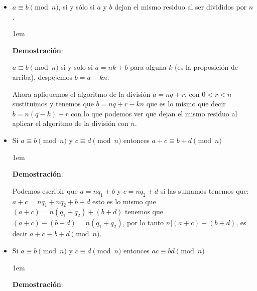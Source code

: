 \documentclass[12pt]{report}                                    %
\newenvironment{SmallIndentation}[1][0.75em]                    %
    {\begin{adjustwidth}{#1}{}\begin{footnotesize}}                 %
    {\end{footnotesize}\end{adjustwidth}}                           %
\begin{document}
\begin{itemize}
\begin{SmallIndentation}[1em]
                    \end{SmallIndentation}

                \item $a \equiv b \pmod{n}$, si y sólo si $a$ y $b$ dejan el mismo
                    residuo al ser divididos por $n$.

                    \begin{SmallIndentation}[1em]
                        \textbf{Demostración}:

                        $a \equiv b \pmod{n}$ si y solo si $a=nk+b$ para alguna $k$ (es
                        la proposición de arriba), despejemos $b=a-kn$.

                        Ahora apliquemos el algoritmo de la división $a=nq+r$, con $0<r<n$
                        sustituimos y tenemos que $b=nq+r -kn$ que es lo mismo que decir
                        $b=n(q-k)+r$ con lo que podemos ver que dejan el mismo residuo al 
                        aplicar el algoritmo de la división con $n$.

                    \end{SmallIndentation}


                \item Si $a \equiv b \pmod{n}$ y $c \equiv d \pmod{n}$ entonces
                        $a+c \equiv b+d \pmod{n}$

                    \begin{SmallIndentation}[1em]
                        \textbf{Demostración}:

                        Podemos escribir que $a=nq_1+b$ y $c=nq_2+d$ si las sumamos tenemos que:
                        $a+c=nq_1 + nq_2 + b+d$ esto es lo mismo que $(a+c)=n(q_1+q_2)+(b+d)$ tenemos que
                        $(a+c) - (b+d) = n(q_1+q_2)$, por lo tanto $n|(a+c) - (b+d)$, es decir
                        $a+c \equiv b+d \pmod{n}$.

                    \end{SmallIndentation}

                \item Si $a \equiv b \pmod{n}$ y $c \equiv d \pmod{n}$ entonces
                        $ac \equiv bd \pmod{n}$

                    \begin{SmallIndentation}[1em]
                        \textbf{Demostración}:


\end{SmallIndentation}
\end{itemize}
\end{document}
